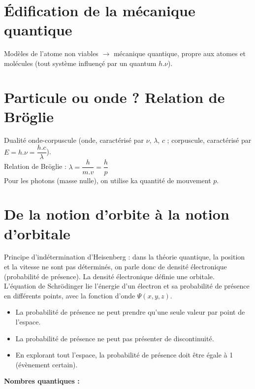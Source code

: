 \documentclass[13pt, twoside, a4paper, french, tikz]{report}
\begin{document}
  
  \section{Édification de la mécanique quantique}\label{sec:edification-de-la-mecanique-quantique}
    
    Modèles de l'atome non viables $\rightarrow$ mécanique quantique, propre aux atomes et molécules (tout système influençé par un quantum $h.\nu$).
  
  
  \section{Particule ou onde ? Relation de Bröglie}\label{sec:particule-ou-onde-?-relation-de-broglie}
    
    Dualité onde-corpuscule (onde, caractérisé par $\nu$, $\lambda$, $c$ ; corpuscule, caractérisé par $E = h . \nu = \dfrac{h.c}{\lambda}$).\\
    Relation de Bröglie : $\lambda = \dfrac{h}{m . v} = \dfrac{h}{p}$\\
    Pour les photons (masse nulle), on utilise ka quantité de mouvement $p$.
  
  
  \section{De la notion d'orbite à la notion d'orbitale}\label{sec:de-la-notion-dorbite-a-la-notion-dorbitale}
    
    Principe d'indétermination d'Heisenberg : dans la théorie quantique, la position et la vitesse ne sont pas déterminés, on parle donc de densité électronique (probabilité de présence).
    La densité électronique définie une orbitale.\\
    
    L'équation de Schrödinger lie l'énergie d'un électron et sa probabilité de présence en différents points, avec la fonction d'onde $\Psi(x, y, z)$.
    \begin{itemize}
      \item La probabilité de présence ne peut prendre qu'une seule valeur par point de l'espace.
      \item La probabilité de présence ne peut pas présenter de discontinuité.
      \item En explorant tout l'espace, la probabilité de présence doit être égale à 1 (évènement certain).
    \end{itemize}
    
    \vspace{7pt}
    \textbf{Nombres quantiques :}
    \vspace{7pt}
    
\end{document}
